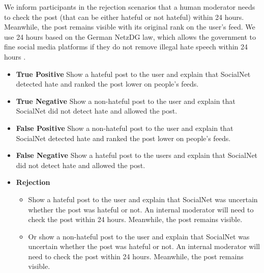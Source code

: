 %
We inform participants in the rejection scenarios that a human moderator needs to check the post (that can be either hateful or not hateful) within 24 hours.
%
Meanwhile, the post remains visible with its original rank on the user's feed.
%
We use 24 hours based on the German NetzDG law, which allows the government to fine social media platforms if they do not remove illegal hate speech within 24 hours \citep{tworek2019analysis}.
%
\begin{itemize}
    \item \textbf{True Positive} Show a hateful post to the user and explain that SocialNet detected hate and ranked the post lower on people's feeds.
    \item \textbf{True Negative} Show a non-hateful post to the user and explain that SocialNet did not detect hate and allowed the post.
    \item \textbf{False Positive} Show a non-hateful post to the user and explain that SocialNet detected hate and ranked the post lower on people's feeds.
    \item \textbf{False Negative} Show a hateful post to the users and explain that SocialNet did not detect hate and allowed the post.
    \item \textbf{Rejection}
          \begin{itemize}
              \item Show a hateful post to the user and explain that SocialNet was uncertain whether the post was hateful or not. An internal moderator will need to check the post within 24 hours. Meanwhile, the post remains visible.
              \item Or show a non-hateful post to the user and explain that SocialNet was uncertain whether the post was hateful or not. An internal moderator will need to check the post within 24 hours. Meanwhile, the post remains visible.
          \end{itemize}
\end{itemize}

